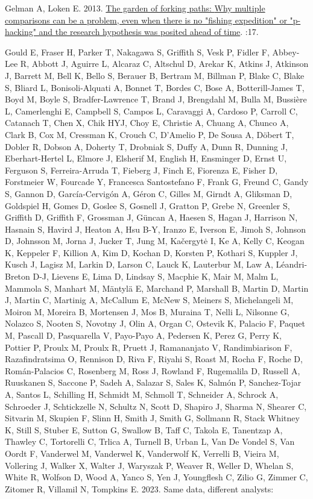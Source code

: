 \documentclass[10pt,a4paper]{article}
\newlength{\cslhangindent}
\newlength{\cslentryspacingunit} %
\newenvironment{CSLReferences}[2] %
 {%
  \setlength{\parindent}{0pt}
  \ifodd #1
  \let\oldpar\par
  \def\par{\hangindent=\cslhangindent\oldpar}
  \fi
  \setlength{\parskip}{#2\cslentryspacingunit}
 }%
 {}
\begin{document}
\begin{CSLReferences}{1}{0}
Gelman A, Loken E. 2013. \href{http://www.stat.columbia.edu/~gelman/research/unpublished/p_hacking.pdf}{The garden of forking paths: {Why} multiple comparisons can be a problem, even when there is no "fishing expedition" or "p-hacking" and the research hypothesis was posited ahead of time}. :17.

Gould E, Fraser H, Parker T, Nakagawa S, Griffith S, Vesk P, Fidler F, Abbey-Lee R, Abbott J, Aguirre L, Alcaraz C, Altschul D, Arekar K, Atkins J, Atkinson J, Barrett M, Bell K, Bello S, Berauer B, Bertram M, Billman P, Blake C, Blake S, Bliard L, Bonisoli-Alquati A, Bonnet T, Bordes C, Bose A, Botterill-James T, Boyd M, Boyle S, Bradfer-Lawrence T, Brand J, Brengdahl M, Bulla M, Bussière L, Camerlenghi E, Campbell S, Campos L, Caravaggi A, Cardoso P, Carroll C, Catanach T, Chen X, Chik HYJ, Choy E, Christie A, Chuang A, Chunco A, Clark B, Cox M, Cressman K, Crouch C, D'Amelio P, De Sousa A, Döbert T, Dobler R, Dobson A, Doherty T, Drobniak S, Duffy A, Dunn R, Dunning J, Eberhart-Hertel L, Elmore J, Elsherif M, English H, Ensminger D, Ernst U, Ferguson S, Ferreira-Arruda T, Fieberg J, Finch E, Fiorenza E, Fisher D, Forstmeier W, Fourcade Y, Francesca Santostefano F, Frank G, Freund C, Gandy S, Gannon D, García-Cervigón A, Géron C, Gilles M, Girndt A, Gliksman D, Goldspiel H, Gomes D, Goslee S, Gosnell J, Gratton P, Grebe N, Greenler S, Griffith D, Griffith F, Grossman J, Güncan A, Haesen S, Hagan J, Harrison N, Hasnain S, Havird J, Heaton A, Hsu B-Y, Iranzo E, Iverson E, Jimoh S, Johnson D, Johnsson M, Jorna J, Jucker T, Jung M, Kačergytė I, Ke A, Kelly C, Keogan K, Keppeler F, Killion A, Kim D, Kochan D, Korsten P, Kothari S, Kuppler J, Kusch J, Lagisz M, Larkin D, Larson C, Lauck K, Lauterbur M, Law A, Léandri-Breton D-J, Lievens E, Lima D, Lindsay S, Macphie K, Mair M, Malm L, Mammola S, Manhart M, Mäntylä E, Marchand P, Marshall B, Martin D, Martin J, Martin C, Martinig A, McCallum E, McNew S, Meiners S, Michelangeli M, Moiron M, Moreira B, Mortensen J, Mos B, Muraina T, Nelli L, Nilsonne G, Nolazco S, Nooten S, Novotny J, Olin A, Organ C, Ostevik K, Palacio F, Paquet M, Pascall D, Pasquarella V, Payo-Payo A, Pedersen K, Perez G, Perry K, Pottier P, Proulx M, Proulx R, Pruett J, Ramananjato V, Randimbiarison F, Razafindratsima O, Rennison D, Riva F, Riyahi S, Roast M, Rocha F, Roche D, Román-Palacios C, Rosenberg M, Ross J, Rowland F, Rugemalila D, Russell A, Ruuskanen S, Saccone P, Sadeh A, Salazar S, Sales K, Salmón P, Sanchez-Tojar A, Santos L, Schilling H, Schmidt M, Schmoll T, Schneider A, Schrock A, Schroeder J, Schtickzelle N, Schultz N, Scott D, Shapiro J, Sharma N, Shearer C, Sitvarin M, Skupien F, Slinn H, Smith J, Smith G, Sollmann R, Stack Whitney K, Still S, Stuber E, Sutton G, Swallow B, Taff C, Takola E, Tanentzap A, Thawley C, Tortorelli C, Trlica A, Turnell B, Urban L, Van De Vondel S, Van Oordt F, Vanderwel M, Vanderwel K, Vanderwolf K, Verrelli B, Vieira M, Vollering J, Walker X, Walter J, Waryszak P, Weaver R, Weller D, Whelan S, White R, Wolfson D, Wood A, Yanco S, Yen J, Youngflesh C, Zilio G, Zimmer C, Zitomer R, Villamil N, Tompkins E. 2023. Same data, different analysts: 
\end{CSLReferences}
\end{document}
